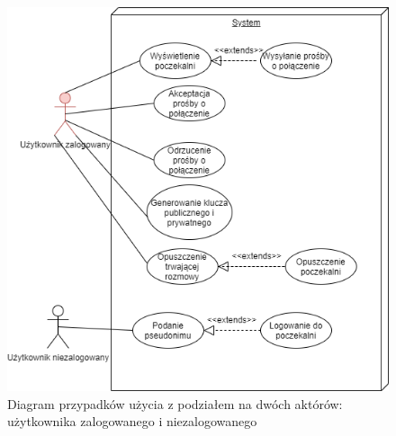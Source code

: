 \begin{figure}[H]
\includegraphics[width=\textwidth]{images/TIP-diagramPU.png}
\centering	
\caption{Diagram przypadków użycia z podziałem na dwóch aktórów: użytkownika zalogowanego i niezalogowanego}
\end{figure}




